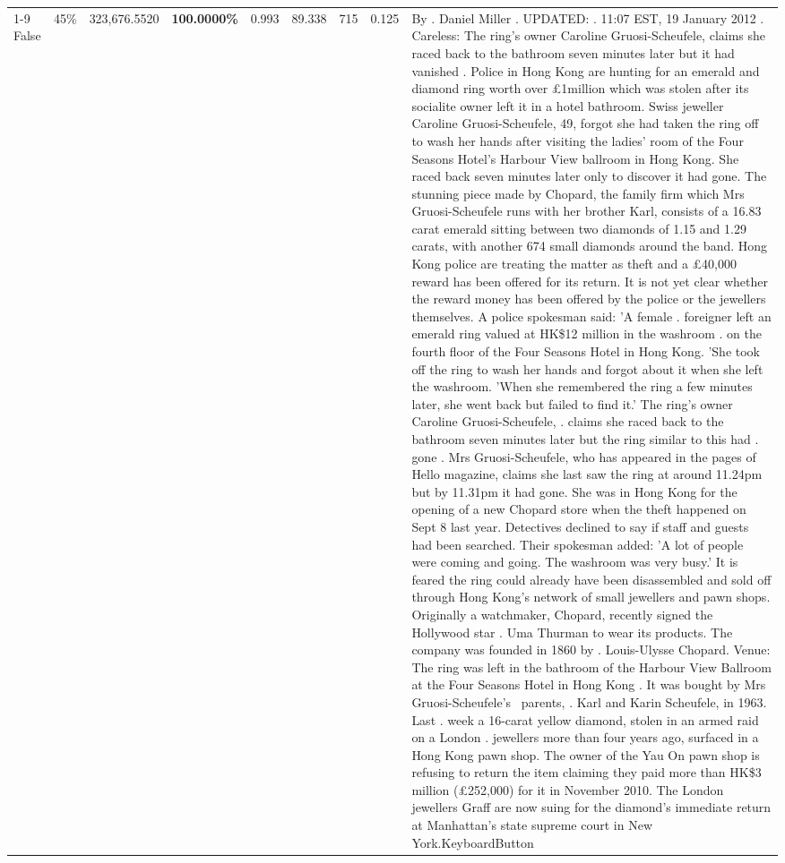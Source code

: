 \begin{table}[H]
\begin{tabular}{lllrlllll}
\cline{1-9} \cline{2-9}
False & 45\% & 323,676.5520 & \bfseries \color{red} 100.0000\% & 0.993 & 89.338 & 715 & 0.125 & By . Daniel Miller . UPDATED: . 11:07 EST, 19 January 2012 . Careless: The ring's owner Caroline Gruosi-Scheufele, claims she raced back to the bathroom seven minutes later but it had vanished . Police in Hong Kong are hunting for an emerald and diamond ring worth over £1million which was stolen after its socialite owner left it in a hotel bathroom. Swiss jeweller Caroline Gruosi-Scheufele, 49, forgot she had taken the ring off to wash her hands after visiting the ladies' room of the Four Seasons Hotel's Harbour View ballroom in Hong Kong. She raced back seven minutes later only to discover it had gone. The stunning piece made by Chopard, the family firm which Mrs Gruosi-Scheufele runs with her brother Karl, consists of a 16.83 carat emerald sitting between two diamonds of 1.15 and 1.29 carats, with another 674 small diamonds around the band. Hong Kong police are treating the matter as theft and a £40,000 reward has been offered for its return. It is not yet clear whether the reward money has been offered by the police or the jewellers themselves. A police spokesman said: 'A female . foreigner left an emerald ring valued at HK\$12 million in the washroom . on the fourth floor of the Four Seasons Hotel in Hong Kong. 'She took off the ring to wash her hands and forgot about it when she left the washroom. 'When she remembered the ring a few minutes later, she went back but failed to find it.' The ring's owner Caroline Gruosi-Scheufele, . claims she raced back to the bathroom seven minutes later but the ring similar to this had . gone . Mrs Gruosi-Scheufele, who has appeared in the pages of Hello magazine, claims she last saw the ring at around 11.24pm but by 11.31pm it had gone. She was in Hong Kong for the opening of a new Chopard store when the theft happened on Sept 8 last year. Detectives declined to say if staff and guests had been searched. Their spokesman added: 'A lot of people were coming and going. The washroom was very busy.' It is feared the ring could already have been disassembled and sold off through Hong Kong's network of small jewellers and pawn shops. Originally a watchmaker, Chopard, recently signed the Hollywood star . Uma Thurman to wear its products. The company was founded in 1860 by . Louis-Ulysse Chopard. Venue: The ring was left in the bathroom of the Harbour View Ballroom at the Four Seasons Hotel in Hong Kong . It was bought by Mrs Gruosi-Scheufele's  parents, . Karl and Karin Scheufele, in 1963. Last . week a 16-carat yellow diamond, stolen in an armed raid on a London . jewellers more than four years ago, surfaced in a Hong Kong pawn shop. The owner of the Yau On pawn shop is refusing to return the item claiming they paid more than HK\$3 million (£252,000) for it in November 2010. The London jewellers Graff are now suing for the diamond’s immediate return at Manhattan’s state supreme court in New York.KeyboardButton \\

\end{tabular}
\end{table}
